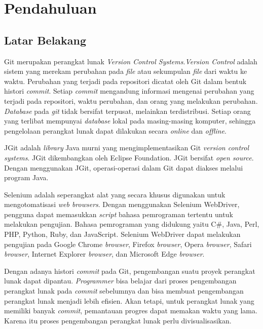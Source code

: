 \chapter{Pendahuluan}
\label{chap:intro}
   
\section{Latar Belakang}
\label{sec:label}
Git merupakan perangkat lunak \textit{Version Control Systems}\cite{chacon2014pro}.\textit{Version Control} adalah sistem yang merekam perubahan pada \textit{file} atau sekumpulan \textit{file} dari waktu ke waktu. Perubahan yang terjadi pada repositori dicatat oleh Git dalam bentuk histori \textit{commit}. Setiap \textit{commit} mengandung informasi mengenai perubahan yang terjadi pada repositori, waktu perubahan, dan orang yang melakukan perubahan. \textit{Database} pada \textit{git} tidak bersifat terpusat, melainkan terdistribusi. Setiap orang yang terlibat mempunyai \textit{database} lokal pada masing-masing komputer, sehingga pengelolaan perangkat lunak dapat dilakukan secara \textit{online} dan \textit{offline}.

JGit adalah \textit{library} Java murni yang mengimplementasikan Git \textit{version control systems}\cite{JGit}. JGit dikembangkan oleh Eclipse Foundation. JGit bersifat \textit{open source}. Dengan menggunakan JGit, operasi-operasi dalam Git dapat diakses melalui program Java. 

Selenium adalah seperangkat alat yang secara khusus digunakan untuk mengotomatisasi \textit{web browsers}\cite{Selenium}. Dengan menggunakan Selenium WebDriver, pengguna dapat memasukkan \textit{script} bahasa pemrograman tertentu untuk melakukan pengujian. Bahasa pemrograman yang didukung yaitu C\#, Java, Perl, PHP, Python, Ruby, dan JavaScript. Selenium WebDriver dapat melakukan pengujian pada Google Chrome \textit{browser},  Firefox \textit{browser}, Opera \textit{browser}, Safari \textit{browser}, Internet Explorer \textit{browser}, dan Microsoft Edge \textit{browser}.  


Dengan adanya histori \textit{commit} pada Git, pengembangan suatu proyek perangkat lunak dapat dipantau. 
\textit{Programmer} bisa belajar dari proses pengembangan perangkat lunak pada \textit{commit} sebelumnya dan bisa membuat pengembangan perangkat lunak menjadi lebih efisien. Akan tetapi, untuk perangkat lunak yang memiliki banyak \textit{commit}, pemantauan progres dapat memakan waktu yang lama. Karena itu proses pengembangan perangkat lunak perlu divisualisasikan. 
  
